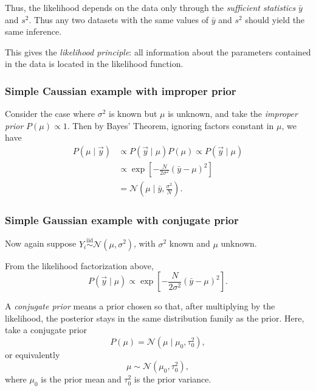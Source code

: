 \documentclass[11pt, titlepage]{article} %
\numberwithin{equation}{section}
\theoremstyle{definition}
\numberwithin{assumption}{section}
\begin{document}
Thus, the likelihood depends on the data only through the \textit{sufficient statistics} $\bar y$ and $s^2$. Thus any two datasets with the same values of $\bar y$ and $s^2$ should yield the same inference.

This gives the \textit{likelihood principle}: all information about the parameters contained in the data is located in the likelihood function.

\subsubsection*{Simple Caussian example with improper prior}

Consider the case where $\sigma^2$ is known but $\mu$ is unknown, and take the \textit{improper prior} $P(\mu)\propto 1$. Then by Bayes' Theorem, ignoring factors constant in $\mu$, we have
\begin{align*}
    P(\mu\mid \vec y)&\propto P(\vec y\mid \mu)P(\mu)\propto P(\vec y\mid \mu)\\
    &\propto
    \exp\!\left[-\frac{N}{2\sigma^2}(\bar y-\mu)^2\right]\\
    &=
    \mathcal{N}\!\left(\mu \mid \bar y,\frac{\sigma^2}{N}\right).
\end{align*}

\subsubsection*{Simple Gaussian example with conjugate prior}

Now again suppose $Y_i \overset{\mathrm{iid}}{\sim} \mathcal{N}(\mu,\sigma^2)$, with $\sigma^2$ known and $\mu$ unknown.

From the likelihood factorization above,
\begin{equation*}
    P(\vec y\mid \mu)
    \propto
    \exp\!\left[-\frac{N}{2\sigma^2}(\bar y-\mu)^2\right].
\end{equation*}

A \textit{conjugate prior} means a prior chosen so that, after multiplying by the likelihood, the posterior stays in the same distribution family as the prior. Here, take a conjugate prior
\begin{equation*}
    P(\mu)=\mathcal{N}(\mu\mid \mu_0,\tau_0^2),
\end{equation*}
or equivalently
\begin{equation*}
    \mu \sim \mathcal{N}(\mu_0,\tau_0^2),
\end{equation*}
where $\mu_0$ is the prior mean and $\tau_0^2$ is the prior variance.
\end{document}
